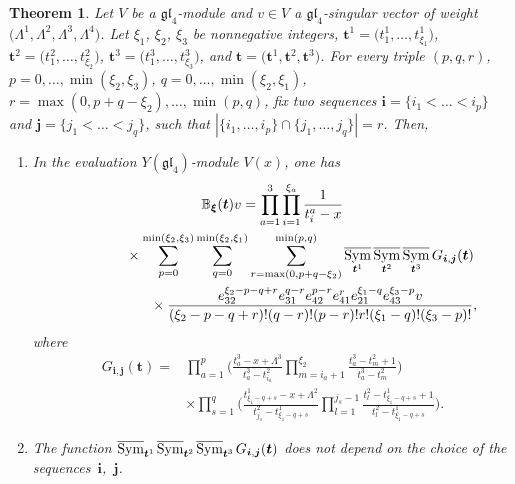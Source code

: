 \documentclass[pdftex]{sigma}
\numberwithin{equation}{section}
\newtheorem{Theorem}{Theorem}[section]
\DeclareMathOperator{\Symb}{\overline{Sym} }
\begin{document}
\begin{Theorem}\label{main2}
Let $V$ be a $\mathfrak{gl}_4$-module and $v\in V$ a $\mathfrak{gl}_4$-singular vector of weight $\bigl(\Lambda^1,\Lambda^2,\Lambda^3,\Lambda^4\bigr)$. Let $\xi_1$, $\xi_2$, $\xi_3$ be nonnegative integers, $\boldsymbol{t}^1=\bigl(t^1_1,\dots,t^1_{\xi_1}\bigr)$, $\boldsymbol{t}^2=\bigl(t^2_1,\dots,t^2_{\xi_2}\bigr)$, $\boldsymbol{t}^3=\bigl(t^3_1,\dots,t^3_{\xi_3}\bigr)$, and $\boldsymbol{t}=\bigl(\boldsymbol{t}^1,\boldsymbol{t}^2,\boldsymbol{t}^3\bigr)$. For every triple $(p,q,r)$, $p=0,\dots,\min(\xi_2,\xi_3)$, $q=0,\dots,\min(\xi_2,\xi_1)$, $r=\max (0, p+q-\xi_2),\dots,\min(p,q)$, fix two sequences $\boldsymbol{i}=\{i_1<\dots<i_p\}$ and $\boldsymbol{j}=\{j_1<\dots<j_q\}$, such that $|\{i_1,\dots,i_p\}\cap \{j_1,\dots,j_q\}|=r$. Then,
\begin{enumerate}\itemsep=0pt
\item[$(a)$] In the evaluation $Y(\mathfrak{gl}_4)$-module $V(x)$, one has
\begin{gather}
{\mathbb{B}}_{\boldsymbol{\xi}}(\boldsymbol{t}) v =\prod_{a=1}^{3}\prod_{i=1}^{\xi_a}\frac{1}{t^a_i-x} \nonumber\\
 \hphantom{{\mathbb{B}}_{\boldsymbol{\xi}}(\boldsymbol{t}) v =}{}
 \times\sum\limits_{p=0}^{\min(\xi_2,\xi_3)} \sum\limits_{q=0}^{\min(\xi_2,\xi_1)}\sum\limits_{r=\max (0, p+q-\xi_2)}^{\min(p,q)}
 \Symb_{\boldsymbol{t}^1} \Symb_{\boldsymbol{t}^2} \Symb_{\boldsymbol{t}^3} G_{\boldsymbol{i},\boldsymbol{j}}(\boldsymbol{t}) \nonumber\\
 \hphantom{{\mathbb{B}}_{\boldsymbol{\xi}}(\boldsymbol{t}) v =}{}
 \qquad\times\frac{e_{32}^{\xi_2-p-q+r} e_{31}^{q-r} e_{42}^{p-r} e_{41}^{r} e_{21}^{\xi_1-q} e_{43}^{\xi_3-p}v}{(\xi_2-p-q+r)!(q-r)!(p-r)! r!(\xi_1-q)!(\xi_3-p)!}, \label{mainTh2}
\end{gather}
where
\begin{align}
G_{\boldsymbol{i},\boldsymbol{j}}(\boldsymbol{t})={}& \prod_{a=1}^{p} \Biggl(\frac{t^3_a-x+\Lambda^3}{t_a^3-t^2_{i_a}}\prod_{ m=i_a+1}^{\xi_2} \frac{t_a^3-t^2_m+1}{t_a^3-t^2_m} \Biggr) \nonumber\\
&{\times}\prod_{s=1}^{q} \Biggl( \frac{t_{\xi_1-q+s}^1-x+\Lambda^2}{t^2_{j_{s}}-t^1_{\xi_1-q+s}}\prod_{ l=1}^{j_s-1} \frac{t^2_l-t_{\xi_1-q+s}^1+1}{t^2_l-t^1_{\xi_1-q+s}} \Biggr).\label{Gfu}
\end{align}
\item[$(b)$] The function $\Symb_{\boldsymbol{t}^1} \hspace{-0.3pt} \Symb_{\boldsymbol{t}^2}\hspace{-0.3pt} \Symb_{\boldsymbol{t}^3}\hspace{-0.3pt} G_{\boldsymbol{i},\boldsymbol{j}}(\boldsymbol{t})$ does not depend on the choice of the sequences~$\boldsymbol{i}$,~$\boldsymbol{j}$.
\end{enumerate}
\end{Theorem}
\end{document}
